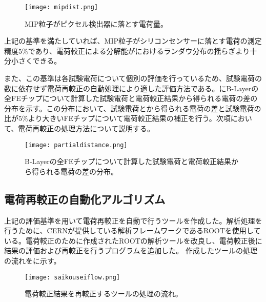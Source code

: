 \begin{figure}[tbp]
  \centering
  \texttt{[image: mipdist.png]}
  \caption[MIP粒子がピクセル検出器に落とす電荷量]{MIP粒子がピクセル検出器に落とす電荷量。}
  \label{fig:mipdist}
\end{figure}

上記の基準を満たしていれば、MIP粒子がシリコンセンサーに落とす電荷の測定精度$5\%$であり、電荷較正による分解能がにおけるランダウ分布の揺らぎより十分小さくできる。

また、この基準は各試験電荷について個別の評価を行っているため、試験電荷の数に依存せず電荷再較正の自動処理により適した評価方法である。にB-Layerの全FEチップについて計算した試験電荷と電荷較正結果から得られる電荷の差の分布を示す。この分布において、試験電荷とから得られる電荷の差と試験電荷の比が$5\% $より大きいFEチップについて電荷較正結果の補正を行う。次項において、電荷再較正の処理方法について説明する。

\begin{figure}[tbp]
  \centering
  \texttt{[image: partialdistance.png]}
  \caption[B-Layerの全FEチップについて計算した試験電荷と電荷較正結果から得られる電荷の差の分布]{B-Layerの全FEチップについて計算した試験電荷と電荷較正結果から得られる電荷の差の分布。}
  \label{fig:partialdistance}
\end{figure}


\subsection{電荷再較正の自動化アルゴリズム}
上記の評価基準を用いて電荷再較正を自動で行うツールを作成した。解析処理を行うために、CERNが提供している解析フレームワークであるROOTを使用している。電荷較正のために作成されたROOTの解析ツールを改良し、電荷較正後に結果の評価および再較正を行うプログラムを追加した。
作成したツールの処理の流れをに示す。

\begin{figure}[tbp]
  \centering
  \texttt{[image: saikouseiflow.png]}
  \caption[電荷較正結果を再較正するツールの処理の流れ]{電荷較正結果を再較正するツールの処理の流れ。}
  \label{fig:saikouseiflow}
\end{figure}


